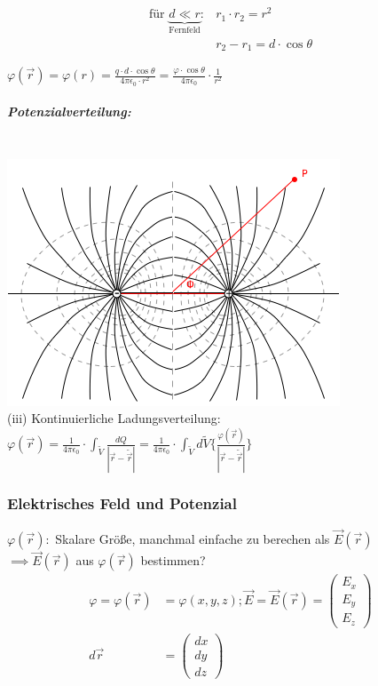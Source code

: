 \documentclass[11pt]{article}
\begin{document}
\begin{align*}
	\text{für } \underbrace{d\ll r}_{\text{Fernfeld}}:& r_1\cdot r_2 = r^2\\
	&r_2-r_1=d\cdot\cos\theta
\end{align*}

$ \varphi(\vec{r})=\varphi(r)=\frac{q\cdot d\cdot \cos\theta}{4\pi\epsilon_0\cdot r^2} = \frac{\varphi\cdot\cos\theta}{4\pi\epsilon_0}\cdot\frac{1}{r^2} $

\subparagraph{Potenzialverteilung:}
\hfill\\
\includegraphics{skizzen/14/14_7B1}
\\
(iii) Kontinuierliche Ladungsverteilung:\\

$ \displaystyle\varphi(\vec{r})=\frac{1}{4\pi\epsilon_0}\cdot\int_{\tilde{V}} \frac{dQ}{|\vec{r}-\tilde{\vec{r}}|} = \frac{1}{4\pi\epsilon_0}\cdot\int_{\tilde{V}} d\tilde{V}\bigg\{\frac{\varphi(\vec{r})}{|\vec{r}-\tilde{\vec{r}}|}\bigg\}$\\

\subsubsection{Elektrisches Feld und Potenzial}

$ \varphi(\vec{r}): $ Skalare Grö\ss{}e, manchmal einfache zu berechen als $ \vec{E}(\vec{r}) $\\

$\implies \vec{E}(\vec{r}) $ aus $ \varphi(\vec{r}) $ bestimmen?\\

\begin{align*}
	\varphi=\varphi(\vec{r}) &= \varphi(x,y,z); \vec{E}= \vec{E}(\vec{r})=\begin{pmatrix}E_x\\ E_y\\ E_z\end{pmatrix}\\
	d\vec{r}&= \begin{pmatrix}dx\\ dy\\ dz\end{pmatrix}
\end{align*}
\end{document}
